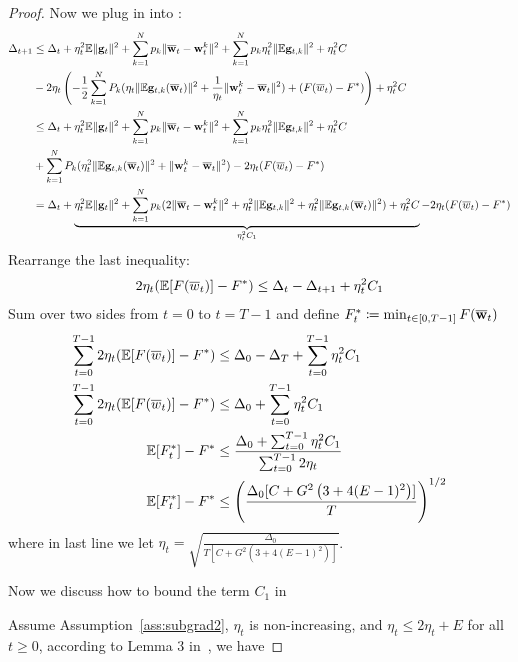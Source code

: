 \begin{proof}
Now we plug in \eq{\ref{eq:a24}} into \eq{\ref{eq:main2}}:
\begin{align}
	\Delta_{t+1} & \leq \Delta_t + 
	\eta_{t}^{2} \mathbb{E}\| {\mathbf{g}}_{t} \|^{2} + \sum_{k=1}^N p_k \|\overline{{\mathbf{w}}}_t - {\mathbf{w}}_t^k\|^2 +  \sum_{k=1}^N p_k \eta_t^2 \|\mathbb{E} {\mathbf{g}}_{t,k}\|^2 + \eta_t^2 C \\
	 &- 2 \eta_t \left(-\frac{1}{2} \sum_{k=1}^{N} P_{k} (\eta_t \|\mathbb{E} {\mathbf{g}}_{t,k}(\overline{{\mathbf{w}}}_t) \|^2 + \frac{1}{\eta_t} \|{\mathbf{w}}_t^k - \overline{{\mathbf{w}}}_t\|^2) + (F(\overline{w}_t) - F^*) \right)  + \eta_t^2 C \\
	& \leq \Delta_t + 
	\eta_{t}^{2} \mathbb{E}\| {\mathbf{g}}_{t} \|^{2} + \sum_{k=1}^N p_k \|\overline{{\mathbf{w}}}_t - {\mathbf{w}}_t^k\|^2 +  \sum_{k=1}^N p_k \eta_t^2 \|\mathbb{E} {\mathbf{g}}_{t,k}\|^2  + \eta_t^2 C  \\
	& +\sum_{k=1}^{N} P_{k} (\eta_t^2 \|\mathbb{E} {\mathbf{g}}_{t,k}(\overline{{\mathbf{w}}}_t) \|^2 + \|{\mathbf{w}}_t^k - \overline{{\mathbf{w}}}_t\|^2) - 2\eta_t (F(\overline{w}_t) - F^*) \\
	& = \Delta_t + \underbrace{\eta_{t}^{2} \mathbb{E}\| {\mathbf{g}}_{t} \|^{2} +\sum_{k=1}^N p_k  ( 2\|\overline{{\mathbf{w}}}_t - {\mathbf{w}}_t^k\|^2  +  \eta_t^2 \|\mathbb{E} {\mathbf{g}}_{t,k}\|^2 + \eta_t^2 \|\mathbb{E} {\mathbf{g}}_{t,k}(\overline{{\mathbf{w}}}_t) \|^2 ) + \eta_t^2 C }_{\eta_t^2C_1}  - 2\eta_t (F(\overline{w}_t) - F^*) \label{eq:main3}
\end{align}
Rearrange the last inequality:
\begin{align}
	2\eta_t (\mathbb{E}[F(\overline{w}_t)] - F^*) \leq \Delta_t - \Delta_{t+1} + \eta_t^2 C_1 
\end{align}
Sum over two sides from $t=0$ to $t = T- 1$ and define $F^*_t \coloneqq \min_{t \in [0, T-1]} F(\overline{{\mathbf{w}}}_t)$
\begin{align}
	\sum_{t=0}^{T-1} 2\eta_t(\mathbb{E}[F(\overline{w}_t)] - F^*) & \leq \Delta_0 - \Delta_T + \sum_{t=0}^{T-1} \eta_t^2 C_1 \\
	\sum_{t=0}^{T-1} 2\eta_t(\mathbb{E}[F(\overline{w}_t)]- F^*) & \leq \Delta_0 + \sum_{t=0}^{T-1} \eta_t^2 C_1 \\
    \mathbb{E}[F^*_t] - F^* &\leq \frac{\Delta_0 + \sum_{t=0}^{T-1} \eta_t^2C_1 }{ \sum_{t=0}^{T-1}  2 \eta_t}\\
    \mathbb{E}[F^*_t] - F^* &\leq  \left(\frac{\Delta_0[C+ G^2 \left(3 + 4(E-1)^2\right)]}{T}\right)^{1/2}
\end{align}
where in last line we let $\eta_t  = \sqrt{ \frac{\Delta_0}{T[C+ G^2 \left(3 + 4(E-1)^2\right)]}}$.

Now we discuss how to bound the term $C_1$ in \eq{\ref{eq:main3}}

Assume Assumption~\ref{ass:subgrad2}, $\eta_t$ is non-increasing, and $\eta_t \leq 2\eta_t+E$ for all $t\geq 0$, according to Lemma 3 in~\cite{li2019convergence}, we have



\end{proof}
